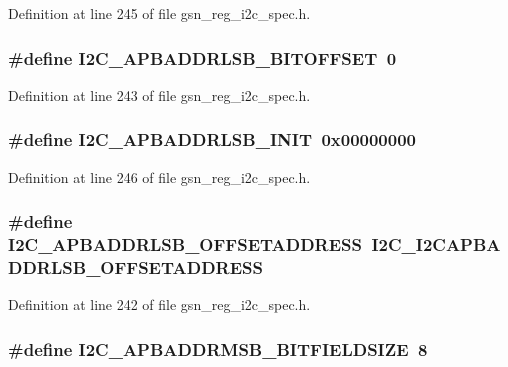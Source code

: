Definition at line 245 of file gsn\_\-reg\_\-i2c\_\-spec.h.

\hypertarget{a00558_abb423f5773ddc2920b6ea4fe5b3b8a0b}{
\subsubsection[{I2C\_\-APBADDRLSB\_\-BITOFFSET}]{\setlength{\rightskip}{0pt plus 5cm}\#define I2C\_\-APBADDRLSB\_\-BITOFFSET~0}}
\label{a00558_abb423f5773ddc2920b6ea4fe5b3b8a0b}


Definition at line 243 of file gsn\_\-reg\_\-i2c\_\-spec.h.

\hypertarget{a00558_a03eda352901f56bf7d34337af8d0fe56}{
\subsubsection[{I2C\_\-APBADDRLSB\_\-INIT}]{\setlength{\rightskip}{0pt plus 5cm}\#define I2C\_\-APBADDRLSB\_\-INIT~0x00000000}}
\label{a00558_a03eda352901f56bf7d34337af8d0fe56}


Definition at line 246 of file gsn\_\-reg\_\-i2c\_\-spec.h.

\hypertarget{a00558_a8c3824488b6c53e3d9dd5ff856d79649}{
\subsubsection[{I2C\_\-APBADDRLSB\_\-OFFSETADDRESS}]{\setlength{\rightskip}{0pt plus 5cm}\#define I2C\_\-APBADDRLSB\_\-OFFSETADDRESS~I2C\_\-I2CAPBADDRLSB\_\-OFFSETADDRESS}}
\label{a00558_a8c3824488b6c53e3d9dd5ff856d79649}


Definition at line 242 of file gsn\_\-reg\_\-i2c\_\-spec.h.

\hypertarget{a00558_aa06b5941a59937fb82f4c5680a0d85ae}{
\subsubsection[{I2C\_\-APBADDRMSB\_\-BITFIELDSIZE}]{\setlength{\rightskip}{0pt plus 5cm}\#define I2C\_\-APBADDRMSB\_\-BITFIELDSIZE~8}}
\label{a00558_aa06b5941a59937fb82f4c5680a0d85ae}


